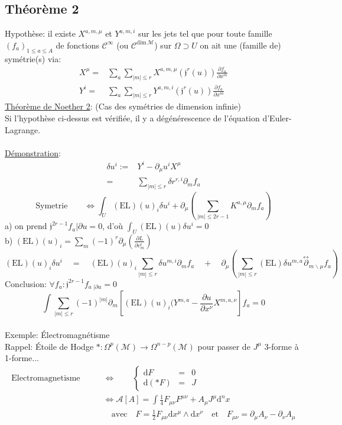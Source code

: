 \documentclass[a4paper,11pt]{article}
\renewcommand{\d}{{\mathrm{d}}}
\newcommand{\dr}[2]{\frac{\partial {#1}}{\partial{#2}}}
\begin{document}
\subsection{Théorème 2}
Hypothèse: il existe $X^{a,m,\mu}$ et $Y^{a,m,i}$ sur les jets tel que pour toute famille $(f_a)_{1\leq a \leq A}$ de fonctions $\mathcal{C}^\infty$ (ou $\mathcal{C}^{\mathrm{dim}\,\mathcal{M}}$) sur $\Omega\supset U$ on ait une (famille de) symétrie(s) via:
\begin{align*}
X^\mu =& \sum_a \sum_{|m|\leq r} X^{a,m,\mu}(\mathfrak{j}^r(u))\dr {f_a}{x^m}\\
Y^i =& \sum_a \sum_{|m|\leq r} Y^{a,m,i}(\mathfrak{j}^r(u))\dr {f_a}{x^m}
\end{align*}
\underline{Théorème de Noether 2}: (Cas des symétries de dimension infinie)\\
Si l'hypothèse ci-dessus est vérifiée, il y a dégénérescence de l'équation d'Euler-Lagrange.\\
\\
\underline{Démonstration}:
\begin{align*}
\delta u^i :=& Y^i - \partial_\mu u^i X^\mu\\
=& \sum_{|m|\leq r} \delta r ^{r,i} \partial_m f_a
\end{align*}
$$\mathrm{Symetrie} \quad \quad \iff \int_U (\mathrm{EL})(u)_i \delta u^i + \partial_\mu \left(\sum_{|m|\leq 2r-1} K^{a,\mu}\partial_m f_a\right)$$
a) on prend $\mathfrak{j}^{2r-1}f_a |{\partial u}=0$, d'où $\int_U (\mathrm{EL})(u)\delta u^i =0$\\
b) $(\mathrm{EL})(u)_i = \sum_m (-1)^r \partial_\mu (\dr L {v^i_m})$ 
$$(\mathrm{EL})(u)_i \delta u^i \quad = \quad (\mathrm{EL})(u)_i \sum_{|m|\leq r} \delta u^{m,i}\partial_m f_a \quad + \quad \partial_\mu \left(\sum_{|m|\leq r} (\mathrm{EL})\delta u^{m,a}\overset{\leftrightarrow}\partial_{m\backslash\mu} f_a\right)$$
Conclusion: $\forall f_a : \mathfrak{j}^{2r-1} f_a\,\!_{|\partial u} = 0$
$$\int \sum_{|m|\leq r} (-1)^|m|\partial_m\left[(\mathrm{EL})(u)_i (Y^{m,a} - \dr u{x^\nu} X^{m,a,\nu}\right] f_a = 0$$
\\
Exemple: Électromagnétisme\\
Rappel: Étoile de Hodge $* : \Omega^p(\mathcal{M})\to \Omega^{n-p}(\mathcal{M})$ pour passer de $J^\mu$ 3-forme à 1-forme...
\begin{align*}
\mathrm{Electromagnetisme} \quad \quad &\iff \quad \quad \left\{
\begin{matrix}\d F & = & 0\\ \d(*F) & = & J\end{matrix}\right.\\
& \iff \mathcal{A}[A] = \int \frac{1}{4}F_{\mu\nu}F^{\mu\nu} + A_\mu J^\mu \d^n x\\
& \quad \mathrm{avec} \quad F = \frac{1}{2} F_{\mu\nu}\d x^\mu \wedge \d x^\nu \quad \mathrm{et}\quad F_{\mu\nu}=\partial_\mu A_\nu - \partial_\nu A_\mu
\end{align*}
\end{document}
